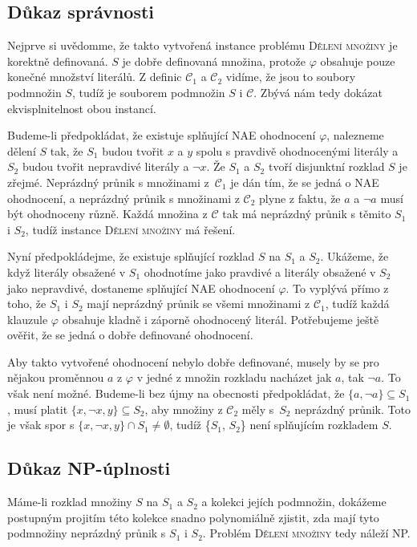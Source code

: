 \documentclass{scrartcl}
\begin{document}
\subsection*{Důkaz správnosti}
Nejprve si uvědomme, že takto vytvořená instance problému \textsc{Dělení množiny} je korektně definovaná. $S$ je dobře definovaná množina, protože $\varphi$ obsahuje pouze konečné množství literálů. Z definic $\mathcal{C}_1$ a $\mathcal{C}_2$ vidíme, že jsou to soubory podmnožin $S$, tudíž je souborem podmnožin $S$ i $\mathcal{C}$. Zbývá nám tedy dokázat ekvisplnitelnost obou instancí.

Budeme-li předpokládat, že existuje splňující NAE ohodnocení $\varphi$, nalezneme dělení $S$ tak, že $S_1$ budou tvořit $x$ a $y$ spolu s pravdivě ohodnocenými literály a $S_2$ budou tvořit nepravdivé literály a $\neg x$. Že $S_1$ a $S_2$ tvoří disjunktní rozklad $S$ je zřejmé. Neprázdný průnik s množinami z~$\mathcal{C}_1$ je dán tím, že se jedná o NAE ohodnocení, a neprázdný průnik s množinami z $\mathcal{C}_2$ plyne z faktu, že $a$ a $\neg a$ musí být ohodnoceny různě. Každá množina z $\mathcal{C}$ tak má neprázdný průnik s těmito $S_1$ i $S_2$, tudíž instance \textsc{Dělení množiny} má řešení.

Nyní předpokládejme, že existuje splňující rozklad $S$ na $S_1$ a $S_2$. Ukážeme, že když literály obsažené v $S_1$ ohodnotíme jako pravdivé a literály obsažené v $S_2$ jako nepravdivé, dostaneme splňující NAE ohodnocení $\varphi$. To vyplývá přímo z toho, že $S_1$ i $S_2$ mají neprázdný průnik se všemi množinami z $\mathcal{C}_1$, tudíž každá klauzule $\varphi$ obsahuje kladně i záporně ohodnocený literál. Potřebujeme ještě ověřit, že se jedná o dobře definované ohodnocení.

Aby takto vytvořené ohodnocení nebylo dobře definované, musely by se pro nějakou proměnnou $a$ z $\varphi$ v jedné z množin rozkladu nacházet jak $a$, tak $\neg a$. To však není možné. Budeme-li bez újmy na obecnosti předpokládat, že $\{a, \neg a\} \subseteq S_1$, musí platit $\{x, \neg x, y\} \subseteq S_2$, aby množiny z $\mathcal{C}_2$ měly s~$S_2$ neprázdný průnik. Toto je však spor s $\{x, \neg x, y\} \cap S_1 \neq \emptyset$, tudíž \{$S_1$, $S_2$\} není splňujícím rozkladem $S$.

\subsection*{Důkaz NP-úplnosti}
Máme-li rozklad množiny $S$ na $S_1$ a $S_2$ a kolekci jejích podmnožin, dokážeme postupným projitím této kolekce snadno polynomiálně zjistit, zda mají tyto podmnožiny neprázdný průnik s $S_1$ i $S_2$. Problém \textsc{Dělení množiny} tedy náleží NP.
\end{document}
